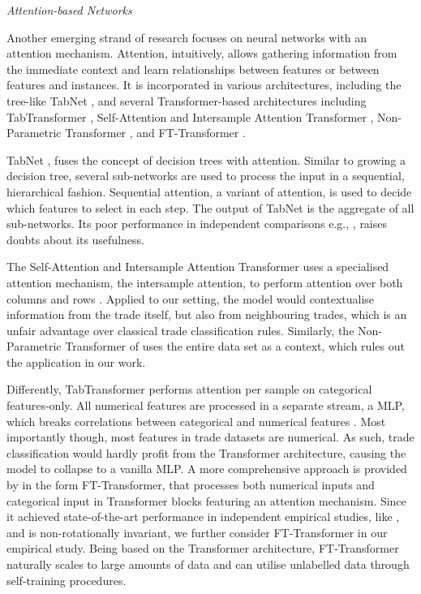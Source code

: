 \emph{Attention-based Networks}

Another emerging strand of research focuses on neural networks with an attention mechanism. Attention, intuitively, allows gathering information from the immediate context and learn relationships between features or between features and instances. It is incorporated in various architectures, including the tree-like TabNet \autocite[][3--5]{arikTabnetAttentiveInterpretable2020}, and several Transformer-based architectures including TabTransformer \autocite[][2--3]{huangTabTransformerTabularData2020}, Self-Attention and Intersample Attention Transformer \autocite[][4--5]{somepalliSaintImprovedNeural2021}, Non-Parametric Transformer \autocite[][3--4]{kossenSelfAttentionDatapointsGoing2021}, and FT-Transformer \autocite[][4--5]{gorishniyRevisitingDeepLearning2021}.

TabNet \autocite[][3--5]{arikTabnetAttentiveInterpretable2020}, fuses the concept of decision trees with attention. Similar to growing a decision tree, several sub-networks are used to process the input in a sequential, hierarchical fashion. Sequential attention, a variant of attention, is used to decide which features to select in each step. The output of TabNet is the aggregate of all sub-networks. Its poor performance in independent comparisons e.g., \textcites[][7]{kadraWelltunedSimpleNets2021}[][7]{gorishniyRevisitingDeepLearning2021}, raises doubts about its usefulness.

The Self-Attention and Intersample Attention Transformer uses a specialised attention mechanism, the intersample attention, to perform attention over both columns and rows \autocite[][4--5]{somepalliSaintImprovedNeural2021}. Applied to our setting, the model would contextualise information from the trade itself, but also from neighbouring trades, which is an unfair advantage over classical trade classification rules. Similarly, the Non-Parametric Transformer of \textcite[][3--4]{kossenSelfAttentionDatapointsGoing2021} uses the entire data set as a context, which rules out the application in our work.

Differently, TabTransformer \autocite[][2--3]{huangTabTransformerTabularData2020} performs attention per sample on categorical features-only. All numerical features are processed in a separate stream, a \gls{MLP}, which breaks correlations between categorical and numerical features \autocite[][2]{somepalliSaintImprovedNeural2021}. Most importantly though, most features in trade datasets are numerical. As such, trade classification would hardly profit from the Transformer architecture, causing the model to collapse to a vanilla \gls{MLP}. A more comprehensive approach is provided by \textcite[][4--5]{gorishniyRevisitingDeepLearning2021} in the form FT-Transformer, that processes both numerical inputs and categorical input in Transformer blocks featuring an attention mechanism. Since it achieved state-of-the-art performance in independent empirical studies, like \textcite[][5]{grinsztajnWhyTreebasedModels2022}, and is non-rotationally invariant, we further consider FT-Transformer in our empirical study. Being based on the Transformer architecture, FT-Transformer naturally scales to large amounts of data and can utilise unlabelled data through self-training procedures.

